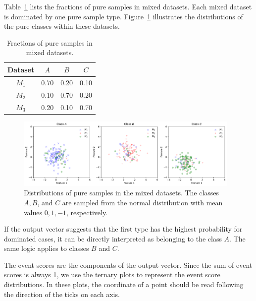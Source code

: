 \documentclass[12pt]{article}
\begin{document}
        Table~\ref{tab:type_fraction_dominated_1} lists the fractions of pure samples in mixed datasets. Each mixed dataset is dominated by one pure sample type. Figure~\ref{fig:pure_sample_distribution_dominated_1} illustrates the distributions of the pure classes within these datasets.
        \begin{table}[htpb]
            \centering
            \caption{Fractions of pure samples in mixed datasets.}
            \label{tab:type_fraction_dominated_1}
            \begin{tabular}{c|ccc}
                Dataset & $A$  & $B$  & $C$  \\ \hline
                $M_1$   & 0.70 & 0.20 & 0.10 \\
                $M_2$   & 0.10 & 0.70 & 0.20 \\
                $M_3$   & 0.20 & 0.10 & 0.70
            \end{tabular}
        \end{table}
        \begin{figure}[htpb]
            \centering
            \includegraphics[width=0.97\textwidth]{multi-class_training_data-dominated_1.pdf}
            \caption{Distributions of pure samples in the mixed datasets. The classes $A, B$, and $C$ are sampled from the normal distribution with mean values $0, 1, -1$, respectively.}
            \label{fig:pure_sample_distribution_dominated_1}
        \end{figure}

        If the output vector suggests that the first type has the highest probability for dominated cases, it can be directly interpreted as belonging to the class $A$. The same logic applies to classes $B$ and $C$.  

        The event scores are the components of the output vector. Since the sum of event scores is always 1, we use the ternary plots to represent the event score distributions. In these plots, the coordinate of a point should be read following the direction of the ticks on each axis. 
\end{document}
